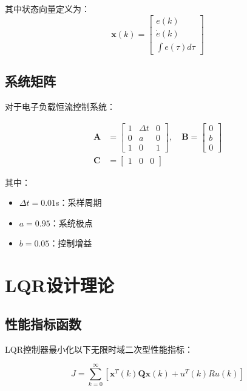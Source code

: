 \documentclass{article}
\begin{document}
其中状态向量定义为：
\begin{equation}
\mathbf{x}(k) = \begin{bmatrix} 
e(k) \\ 
\dot{e}(k) \\ 
\int e(\tau)d\tau 
\end{bmatrix}
\end{equation}

\subsection{系统矩阵}

对于电子负载恒流控制系统：

\begin{align}
\mathbf{A} &= \begin{bmatrix}
1 & \Delta t & 0 \\
0 & a & 0 \\
1 & 0 & 1
\end{bmatrix}, \quad
\mathbf{B} = \begin{bmatrix}
0 \\ b \\ 0
\end{bmatrix} \\
\mathbf{C} &= \begin{bmatrix} 1 & 0 & 0 \end{bmatrix}
\end{align}

其中：
\begin{itemize}
    \item $\Delta t = 0.01$s：采样周期
    \item $a = 0.95$：系统极点
    \item $b = 0.05$：控制增益
\end{itemize}

\section{LQR设计理论}

\subsection{性能指标函数}

LQR控制器最小化以下无限时域二次型性能指标：

\begin{equation}
J = \sum_{k=0}^{\infty} \left[ \mathbf{x}^T(k)\mathbf{Q}\mathbf{x}(k) + u^T(k)Ru(k) \right]
\end{equation}
\end{document}
